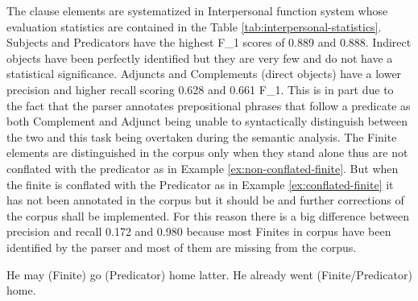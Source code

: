 The clause elements are systematized in Interpersonal function system whose evaluation statistics are contained in the Table \ref{tab:interpersonal-statistics}. Subjects and Predicators have the highest F_{1} scores of 0.889 and 0.888. Indirect objects have been perfectly identified but they are very few and do not have a statistical significance. Adjuncts and Complements (direct objects) have a lower precision and higher recall scoring 0.628 and 0.661 F_{1}. This is in part due to the fact that the parser annotates prepositional phrases that follow a predicate as both Complement and Adjunct being unable to syntactically distinguish between the two and this task being overtaken during the semantic analysis. The Finite elements are distinguished in the corpus only when they stand alone thus are not conflated with the predicator as in Example \ref{ex:non-conflated-finite}. But when the finite is conflated with the Predicator as in Example \ref{ex:conflated-finite} it has not been annotated in the corpus but it should be and further corrections of the corpus shall be implemented. For this reason there is a big difference between precision and recall 0.172 and 0.980 because most Finites in corpus have been identified by the parser and most of them are missing from the corpus. 

\begin{exe}
	\ex \label{ex:non-conflated-finite} He may (Finite) go (Predicator) home latter.
	\ex \label{ex:conflated-finite} He already went (Finite/Predicator) home. 
\end{exe}

